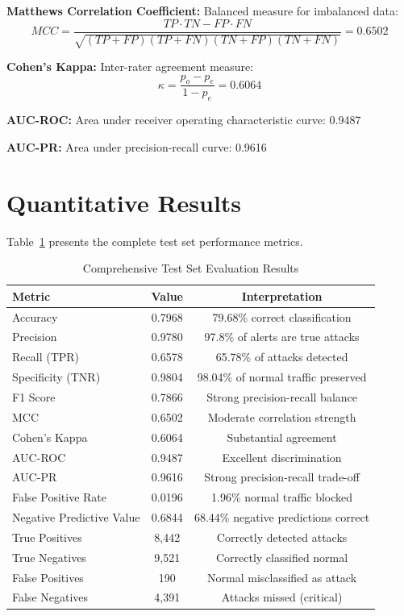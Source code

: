 \documentclass[12pt,a4paper]{report}
\begin{document}
\textbf{Matthews Correlation Coefficient:} Balanced measure for imbalanced data:
\begin{equation}
    MCC = \frac{TP \cdot TN - FP \cdot FN}{\sqrt{(TP+FP)(TP+FN)(TN+FP)(TN+FN)}} = 0.6502
\end{equation}

\textbf{Cohen's Kappa:} Inter-rater agreement measure:
\begin{equation}
    \kappa = \frac{p_o - p_e}{1 - p_e} = 0.6064
\end{equation}

\textbf{AUC-ROC:} Area under receiver operating characteristic curve: 0.9487

\textbf{AUC-PR:} Area under precision-recall curve: 0.9616

\section{Quantitative Results}

Table~\ref{tab:results} presents the complete test set performance metrics.

\begin{table}[H]
\centering
\caption{Comprehensive Test Set Evaluation Results}
\label{tab:results}
\begin{tabular}{lcc}
\toprule
\textbf{Metric} & \textbf{Value} & \textbf{Interpretation} \\
\midrule
Accuracy & 0.7968 & 79.68\% correct classification \\
Precision & 0.9780 & 97.8\% of alerts are true attacks \\
Recall (TPR) & 0.6578 & 65.78\% of attacks detected \\
Specificity (TNR) & 0.9804 & 98.04\% of normal traffic preserved \\
F1 Score & 0.7866 & Strong precision-recall balance \\
MCC & 0.6502 & Moderate correlation strength \\
Cohen's Kappa & 0.6064 & Substantial agreement \\
AUC-ROC & 0.9487 & Excellent discrimination \\
AUC-PR & 0.9616 & Strong precision-recall trade-off \\
False Positive Rate & 0.0196 & 1.96\% normal traffic blocked \\
Negative Predictive Value & 0.6844 & 68.44\% negative predictions correct \\
\midrule
True Positives & 8,442 & Correctly detected attacks \\
True Negatives & 9,521 & Correctly classified normal \\
False Positives & 190 & Normal misclassified as attack \\
False Negatives & 4,391 & Attacks missed (critical) \\
\bottomrule
\end{tabular}
\end{table}
\end{document}
